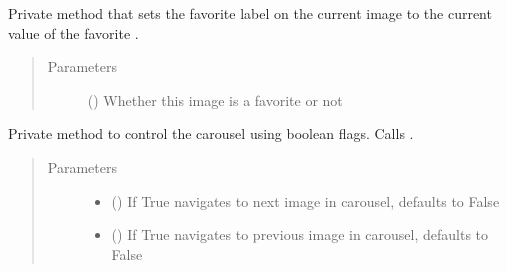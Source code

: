 \documentclass[letterpaper,10pt,english]{sphinxmanual}
\begin{document}
\begin{fulllineitems}
\begin{fulllineitems}
\label{\detokenize{polo.widgets:polo.widgets.slideshow_inspector.slideshowInspector._mark_current_image_as_favorite}}
Private method that sets the favorite label on the current
image to the current value of the favorite .
\begin{quote}\begin{description}
\item[{Parameters}] \leavevmode
{} () \textendash{} Whether this image is a favorite or not

\end{description}\end{quote}

\end{fulllineitems}


\begin{fulllineitems}
\label{\detokenize{polo.widgets:polo.widgets.slideshow_inspector.slideshowInspector._navigate_carousel}}
Private method to control the carousel using boolean flags. Calls 
.
\begin{quote}\begin{description}
\item[{Parameters}] \leavevmode\begin{itemize}
\item {} 
 (\sphinxstyleliteralemphasis{\sphinxupquote{, }}) \textendash{} If True navigates to next image in carousel, 
defaults to False

\item {} 
 (\sphinxstyleliteralemphasis{\sphinxupquote{, }}) \textendash{} If True navigates to previous image in carousel,
defaults to False


\end{itemize}
\end{description}
\end{quote}
\end{fulllineitems}
\end{fulllineitems}
\end{document}
